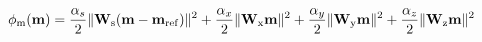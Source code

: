 \begin{equation}
\phi_{\rm m}(\mathbf{m}) =
    \frac{\alpha_s}{2}\|\mathbf{W}_{\rm s}(\mathbf{m} - \mathbf{m}_{\rm ref})\|^2 +
    \frac{\alpha_x}{2}\|\mathbf{W}_{\rm x}\mathbf{m}\|^2 +
    \frac{\alpha_y}{2}\|\mathbf{W}_{\rm y}\mathbf{m}\|^2 +
    \frac{\alpha_z}{2}\|\mathbf{W}_{\rm z}\mathbf{m}\|^2
\label{eq:model_regularization}
\end{equation}
